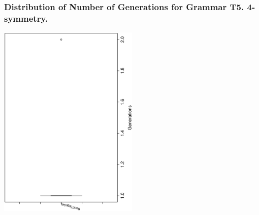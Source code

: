  \begin{frame}
 \frametitle{ Distribution of Number of Generations for Grammar T5. 4-symmetry. }
 \begin{center}
\includegraphics[width=0.5\textwidth, angle=-90]
{ExpFboxplottGenerations002.eps}
 \end{center}
 \label{ExpFboxplottGenerations002.eps}  
 \end{frame}

